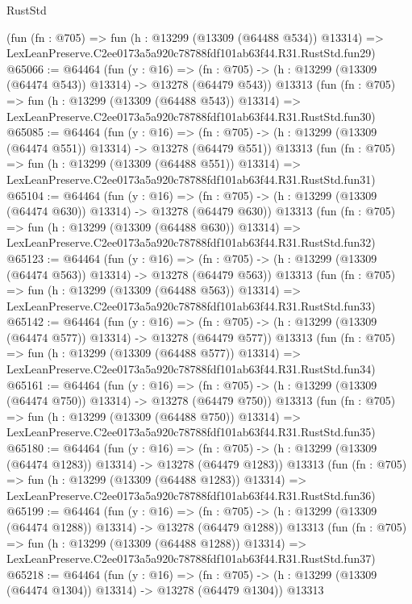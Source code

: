 \begin{lexlean}{RustStd}
\begin{coremodule}
    (fun (fn : @705) =>
    fun (h : @13299 (@13309 (@64488 @534)) @13314) =>
    LexLeanPreserve.C2ee0173a5a920c78788fdf101ab63f44.R31.RustStd.fun29)
@65066 := @64464
    (fun (y : @16) =>
    (fn : @705) -> (h : @13299 (@13309 (@64474 @543)) @13314) -> @13278 (@64479 @543))
    @13313
    (fun (fn : @705) =>
    fun (h : @13299 (@13309 (@64488 @543)) @13314) =>
    LexLeanPreserve.C2ee0173a5a920c78788fdf101ab63f44.R31.RustStd.fun30)
@65085 := @64464
    (fun (y : @16) =>
    (fn : @705) -> (h : @13299 (@13309 (@64474 @551)) @13314) -> @13278 (@64479 @551))
    @13313
    (fun (fn : @705) =>
    fun (h : @13299 (@13309 (@64488 @551)) @13314) =>
    LexLeanPreserve.C2ee0173a5a920c78788fdf101ab63f44.R31.RustStd.fun31)
@65104 := @64464
    (fun (y : @16) =>
    (fn : @705) -> (h : @13299 (@13309 (@64474 @630)) @13314) -> @13278 (@64479 @630))
    @13313
    (fun (fn : @705) =>
    fun (h : @13299 (@13309 (@64488 @630)) @13314) =>
    LexLeanPreserve.C2ee0173a5a920c78788fdf101ab63f44.R31.RustStd.fun32)
@65123 := @64464
    (fun (y : @16) =>
    (fn : @705) -> (h : @13299 (@13309 (@64474 @563)) @13314) -> @13278 (@64479 @563))
    @13313
    (fun (fn : @705) =>
    fun (h : @13299 (@13309 (@64488 @563)) @13314) =>
    LexLeanPreserve.C2ee0173a5a920c78788fdf101ab63f44.R31.RustStd.fun33)
@65142 := @64464
    (fun (y : @16) =>
    (fn : @705) -> (h : @13299 (@13309 (@64474 @577)) @13314) -> @13278 (@64479 @577))
    @13313
    (fun (fn : @705) =>
    fun (h : @13299 (@13309 (@64488 @577)) @13314) =>
    LexLeanPreserve.C2ee0173a5a920c78788fdf101ab63f44.R31.RustStd.fun34)
@65161 := @64464
    (fun (y : @16) =>
    (fn : @705) -> (h : @13299 (@13309 (@64474 @750)) @13314) -> @13278 (@64479 @750))
    @13313
    (fun (fn : @705) =>
    fun (h : @13299 (@13309 (@64488 @750)) @13314) =>
    LexLeanPreserve.C2ee0173a5a920c78788fdf101ab63f44.R31.RustStd.fun35)
@65180 := @64464
    (fun (y : @16) =>
    (fn : @705) -> (h : @13299 (@13309 (@64474 @1283)) @13314) -> @13278 (@64479 @1283))
    @13313
    (fun (fn : @705) =>
    fun (h : @13299 (@13309 (@64488 @1283)) @13314) =>
    LexLeanPreserve.C2ee0173a5a920c78788fdf101ab63f44.R31.RustStd.fun36)
@65199 := @64464
    (fun (y : @16) =>
    (fn : @705) -> (h : @13299 (@13309 (@64474 @1288)) @13314) -> @13278 (@64479 @1288))
    @13313
    (fun (fn : @705) =>
    fun (h : @13299 (@13309 (@64488 @1288)) @13314) =>
    LexLeanPreserve.C2ee0173a5a920c78788fdf101ab63f44.R31.RustStd.fun37)
@65218 := @64464
    (fun (y : @16) =>
    (fn : @705) -> (h : @13299 (@13309 (@64474 @1304)) @13314) -> @13278 (@64479 @1304))
    @13313

\end{coremodule}
\end{lexlean}
